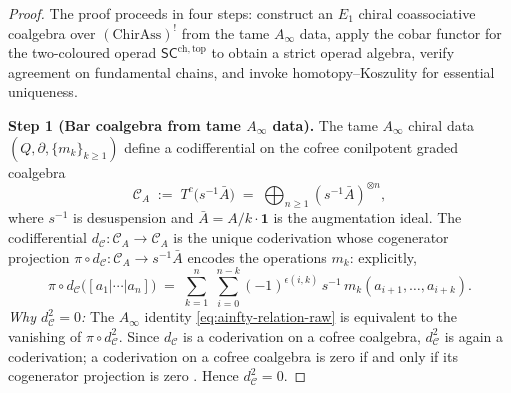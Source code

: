 \begin{proof}
The proof proceeds in four steps: construct an $E_1$ chiral
coassociative coalgebra over $(\mathrm{ChirAss})^!$ from the tame
$A_\infty$ data, apply the cobar functor for the two-coloured
operad $\mathsf{SC}^{\mathrm{ch,top}}$ to obtain a strict operad
algebra, verify agreement on fundamental chains, and invoke
homotopy--Koszulity for essential uniqueness.

\medskip
\textbf{Step 1 (Bar coalgebra from tame $A_\infty$ data).}
The tame $A_\infty$ chiral data $(Q, \partial, \{m_k\}_{k \ge 1})$
define a codifferential on the cofree conilpotent graded coalgebra
\[
 \mathcal{C}_A \;:=\; T^c\!\bigl(s^{-1}\bar{A}\bigr)
 \;=\; \bigoplus_{n \ge 1} (s^{-1}\bar{A})^{\otimes n},
\]
where $s^{-1}$ is desuspension and $\bar{A} = A / k\cdot\mathbf{1}$
is the augmentation ideal. The codifferential
$d_{\mathcal{C}} \colon \mathcal{C}_A \to \mathcal{C}_A$
is the unique coderivation whose cogenerator projection
$\pi \circ d_{\mathcal{C}} \colon \mathcal{C}_A \to s^{-1}\bar{A}$
encodes the operations $m_k$: explicitly,
\[
 \pi \circ d_{\mathcal{C}}\bigl(
 [a_1 | \cdots | a_n]\bigr)
 \;=\; \sum_{k=1}^{n}\;\sum_{i=0}^{n-k}
 (-1)^{\epsilon(i,k)}\,
 s^{-1}\,m_k(a_{i+1}, \ldots, a_{i+k}).
\]
\emph{Why $d_{\mathcal{C}}^2 = 0$:} The $A_\infty$ identity
\eqref{eq:ainfty-relation-raw} is equivalent to the vanishing of
$\pi \circ d_{\mathcal{C}}^2$. Since $d_{\mathcal{C}}$ is a
coderivation on a cofree coalgebra, $d_{\mathcal{C}}^2$ is again a
coderivation; a coderivation on a cofree coalgebra is zero if and
only if its cogenerator projection is zero \cite{LV12}. Hence
$d_{\mathcal{C}}^2 = 0$.


\end{proof}
